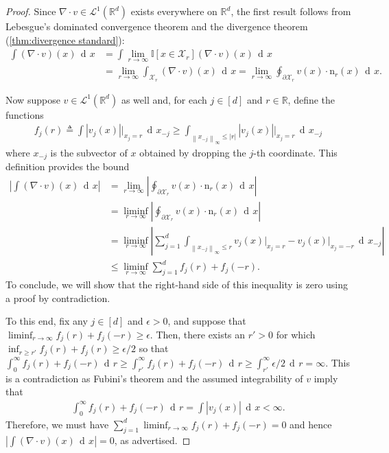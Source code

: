 \documentclass[12pt,paper=letter]{scrreprt}
\newcommand{\eps}{\epsilon}
\newcommand{\dee}{\mathop{\mathrm{d}\!}}
\newcommand{\dx}{\,\dee x}
\newcommand{\dr}{\,\dee r}
\def\mbb#1{\mathbb{#1}}
\def\R{\mathbb{R}}
\newcommand{\Rd}{{\R}^d}
\def\defeq{\triangleq} %
\def\norm#1{\left\|{#1}\right\|} %
\newcommand{\infnorm}[1]{\norm{#1}_{\infty}} %
\def\indic#1{\mbb{I}\left[{#1}\right]} %
\newcommand{\grad}{\nabla} %
\newcommand{\Div}[1]{\grad\cdot{#1}} %
\newcommand{\normal}{\mathrm{n}} %
\newcommand{\evalat}[2]{{#1}\big|_{#2}}
\newcommand{\xset}[0]{\mathcal{X}} %
\newcommand{\Lp}[1][p]{\mathcal{L}^{#1}}
\begin{document}
\begin{proof}
Since $\Div{v} \in \Lp[1](\Rd)$ exists everywhere on $\Rd$, the first result follows from 
Lebesgue's dominated convergence theorem \citep[Thm.~1.34]{rudin1987real} and the divergence theorem (\cref{thm:divergence standard}):
\begin{align*}
\int (\Div{v})(x) \dx 
    &= 
\int \lim_{r\to\infty}\indic{x\in\xset_r} (\Div{v})(x) \dx \\
    &=
\lim_{r\to\infty} \int_{\xset_r} (\Div{v})(x) \dx 
    = 
\lim_{r\to\infty}\oint_{\partial \xset_r} v(x) \cdot \normal_r(x) \dx.
\end{align*}

Now suppose $v\in\Lp[1](\Rd)$ as well and, for each $j\in[d]$ and $r\in\R$, define the functions 
\begin{align*}
f_j(r) 
    \defeq 
\int \evalat{|v_j(x)|}{x_j=r} \dx_{-j}
    \geq
\int_{\infnorm{x_{-j}}\leq |r|} \evalat{|v_j(x)|}{x_j=r} \dx_{-j}
\end{align*} 
where $x_{-j}$ is the subvector of $x$ obtained by dropping the $j$-th coordinate.
This definition provides the bound
\begin{align*}
\left|\int (\Div{v})(x) \dx\right|
    &= 
\lim_{r\to\infty}\left|\oint_{\partial \xset_r} v(x) \cdot \normal_r(x) \dx\right| \\
    &=
\liminf_{r\to\infty}\left|\oint_{\partial \xset_r} v(x) \cdot \normal_r(x) \dx\right|\\
    &=
\liminf_{r\to\infty}\left|\sum_{j=1}^d \int_{\infnorm{x_{-j}}\leq r} \evalat{v_j(x)}{x_j=r} -\evalat{v_j(x)}{x_j=-r} \dx_{-j}\right|\\
    &\leq
\liminf_{r\to\infty} \sum_{j=1}^d f_j(r) + f_j(-r).
\end{align*}
To conclude, we will show that the right-hand side of this inequality is zero using a proof by contradiction.

To this end, fix any $j\in[d]$ and $\eps>0$, and suppose that $\liminf_{r\to\infty} f_j(r) + f_j(-r) \geq \eps$.
Then, there exists an $r' > 0$ for which $\inf_{r\geq r'} f_j(r) + f_j(r) \geq \eps/2$ so that
$\int_0^\infty f_j(r) + f_j(-r) \dr \geq \int_{r'}^\infty  f_j(r) + f_j(-r) \dr \geq  \int_{r'}^\infty \eps/2 \dr = \infty$.
This is a contradiction as 
Fubini's theorem \citep[Thm.~8.8]{rudin1987real} and the assumed integrability of $v$ imply that \begin{align*}
\int_0^\infty f_j(r) + f_j(-r) \dr = \int |v_j(x)| \dx < \infty.
\end{align*}
Therefore, we must have $\sum_{j=1}^d\liminf_{r\to\infty} f_j(r) + f_j(-r) = 0$ and hence $\left|\int (\Div{v})(x) \dx\right|=0$, as advertised.
\end{proof}
\end{document}
